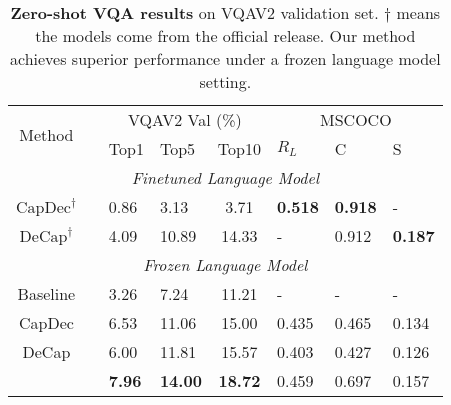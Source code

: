 \begin{table}{}{}
\small
\centering
\tabcolsep=4pt
\begin{tabular}{clllllll}
\toprule
\toprule
\multicolumn{1}{c|}{\multirow{2}{*}{Method}}            &  & \multicolumn{3}{c|}{VQAV2 Val (\%)} & \multicolumn{3}{c}{MSCOCO}                    \\
\multicolumn{1}{c|}{}                                   &              & Top1  & Top5   & \multicolumn{1}{c|}{Top10} & $R_L$  & C     & S     \\ \hline
\multicolumn{8}{c}{\textit{Finetuned Language Model}}                                                                                                      \\ \hline
\multicolumn{1}{c|}{{$\mathrm{CapDec}^\dagger$}}        &              & 0.86 & 3.13 & \multicolumn{1}{c|}{3.71} & \textbf{0.518} & \textbf{0.918} & - \\
\multicolumn{1}{c|}{{$\mathrm{DeCap}^\dagger$}}         &              & 4.09 & 10.89 & \multicolumn{1}{c|}{14.33} & - & 0.912 & \textbf{0.187}  \\ \hline
\multicolumn{8}{c}{\textit{Frozen Language Model}}                                                                                                     \\ \hline
\multicolumn{1}{c|}{Baseline}                           &              & 3.26 & 7.24 & \multicolumn{1}{c|}{11.21} & - & - & - \\
\multicolumn{1}{c|}{CapDec}                             &              & 6.53 & 11.06 & \multicolumn{1}{c|}{15.00} & 0.435 & 0.465 & 0.134 \\
\multicolumn{1}{c|}{DeCap}                              &              & 6.00 & 11.81 & \multicolumn{1}{c|}{15.57} & 0.403 & 0.427 & 0.126 \\
\rowcolor{blue!6}\multicolumn{1}{c|}{MacCap}                             &              & \textbf{7.96} & \textbf{14.00} & \multicolumn{1}{c|}{\textbf{18.72}} & 0.459 & 0.697 & 0.157 \\
\toprule
\end{tabular}
\caption{\textbf{Zero-shot VQA results} on VQAV2 validation set. $\dagger$ means the models come from the official release. Our method achieves superior performance under a frozen language model setting.}
\label{table:VQAV2}
\end{table}




